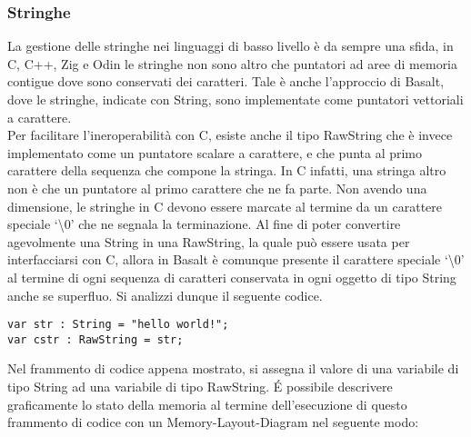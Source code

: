 \subsubsection{Stringhe}
La gestione delle stringhe nei linguaggi di basso livello è da sempre una sfida, in C, C++, Zig e Odin le stringhe non sono altro 
che puntatori ad aree di memoria contigue dove sono conservati dei caratteri. Tale è anche l’approccio di Basalt, dove le stringhe, 
indicate con String, sono implementate come puntatori vettoriali a carattere. \\

Per facilitare l’ineroperabilità con C, esiste anche il tipo RawString che è invece implementato come un puntatore scalare a carattere, 
e che punta al primo carattere della sequenza che compone la stringa. In C infatti, una stringa altro non è che un puntatore al primo 
carattere che ne fa parte. Non avendo una dimensione, le stringhe in C devono essere marcate al termine da un carattere speciale ‘\textbackslash0’ 
che ne segnala la terminazione. Al fine di poter convertire agevolmente una String in una RawString, la quale può essere usata per 
interfacciarsi con C, allora in Basalt è comunque presente il carattere speciale ‘\textbackslash0’ al termine di ogni sequenza di caratteri 
conservata in ogni oggetto di tipo String anche se superfluo. Si analizzi dunque il seguente codice. \\

\vspace{0.5cm}
\begin{lstlisting}[frame=single]
var str : String = "hello world!";
var cstr : RawString = str;
\end{lstlisting}
\vspace{0.5cm}

Nel frammento di codice appena mostrato, si assegna il valore di una variabile di tipo String ad una variabile di tipo RawString. É 
possibile descrivere graficamente lo stato della memoria al termine dell’esecuzione di questo frammento di codice con un 
Memory-Layout-Diagram nel seguente modo: \\


